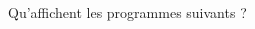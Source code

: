 
\begin{exercice}\label{exosmath-0118}

    Qu'affichent les programmes suivants ?

    \begin{multicols}{2}





    \end{multicols}

\end{exercice}
